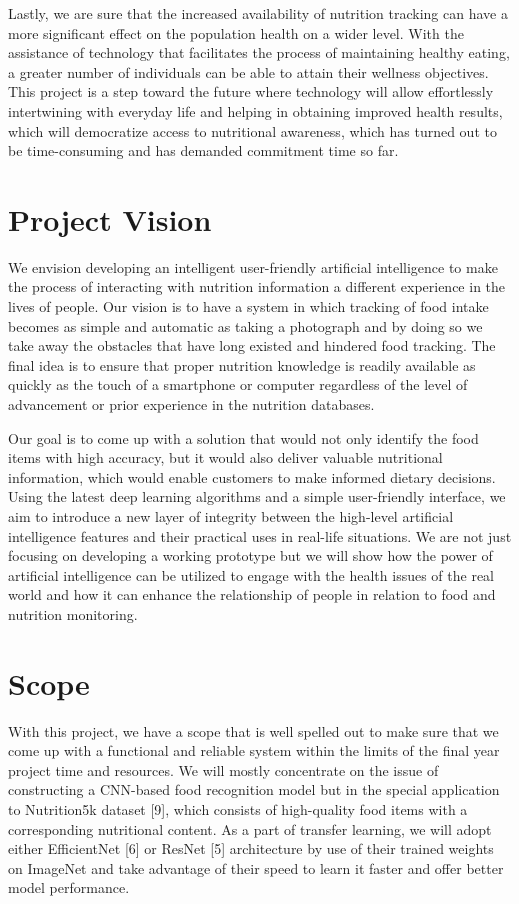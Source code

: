 \documentclass[12pt, openany]{report}
\begin{document}
Lastly, we are sure that the increased availability of nutrition tracking can have a more significant effect on the population health on a wider level. With the assistance of technology that facilitates the process of maintaining healthy eating, a greater number of individuals can be able to attain their wellness objectives. This project is a step toward the future where technology will allow effortlessly intertwining with everyday life and helping in obtaining improved health results, which will democratize access to nutritional awareness, which has turned out to be time-consuming and has demanded commitment time so far.


\section{Project Vision}
We envision developing an intelligent user-friendly artificial intelligence to make the process of interacting with nutrition information a different experience in the lives of people. Our vision is to have a system in which tracking of food intake becomes as simple and automatic as taking a photograph and by doing so we take away the obstacles that have long existed and hindered food tracking. The final idea is to ensure that proper nutrition knowledge is readily available as quickly as the touch of a smartphone or computer regardless of the level of advancement or prior experience in the nutrition databases.

Our goal is to come up with a solution that would not only identify the food items with high accuracy, but it would also deliver valuable nutritional information, which would enable customers to make informed dietary decisions. Using the latest deep learning algorithms and a simple user-friendly interface, we aim to introduce a new layer of integrity between the high-level artificial intelligence features and their practical uses in real-life situations. We are not just focusing on developing a working prototype but we will show how the power of artificial intelligence can be utilized to engage with the health issues of the real world and how it can enhance the relationship of people in relation to food and nutrition monitoring.


\section{Scope}
With this project, we have a scope that is well spelled out to make sure that we come up with a functional and reliable system within the limits of the final year project time and resources. We will mostly concentrate on the issue of constructing a CNN-based food recognition model but in the special application to Nutrition5k dataset [9], which consists of high-quality food items with a corresponding nutritional content. As a part of transfer learning, we will adopt either EfficientNet [6] or ResNet [5] architecture by use of their trained weights on ImageNet and take advantage of their speed to learn it faster and offer better model performance.
\end{document}
